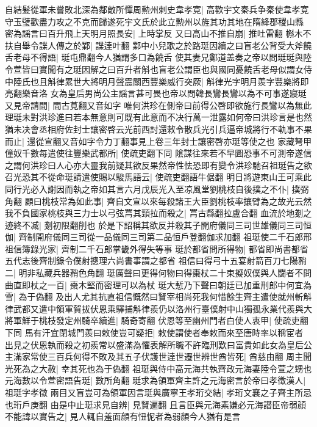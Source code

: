 自結髪從軍未嘗敗北深為鄰敵所憚周勲州刺史韋孝寛|{
	高歡宇文秦兵争秦使韋孝寛守玉璧歡盡力攻之不克而歸遂死宇文氏於此立勲州以旌其功其地在隋絳郡稷山縣}
密為謡言曰百升飛上天明月照長安|{
	上時掌反}
又曰高山不推自崩|{
	推吐雷翻}
槲木不扶自舉令諜人傳之於鄴|{
	諜逹叶翻}
鄴中小兒歌之於路珽因續之曰盲老公背受大斧饒舌老母不得語|{
	珽屯鼎翻今人猶謂多口為饒舌}
使其妻兄鄭道盖奏之帝以問珽珽與陸令萱皆曰實聞有之珽因解之曰百升者斛也盲老公謂臣也與國同憂饒舌老母似謂女侍中陸氏也且斛律累世大將明月聲震關西豐樂威行突厥|{
	斛律光字明月羨字豐樂將即亮翻樂音洛}
女為皇后男尚公主謡言甚可畏也帝以問韓長鸞長鸞以為不可事遂寢珽又見帝請間|{
	間古莧翻又音如字}
唯何洪珍在側帝曰前得公啓即欲施行長鸞以為無此理珽未對洪珍進曰若本無意則可既有此意而不决行萬一泄露如何帝曰洪珍言是也然猶未决會丞相府佐封士讓密啓云光前西討還敕令散兵光引兵逼帝城將行不軌事不果而止|{
	還從宣翻又音如字令力丁翻事見上卷三年封士讓密啓亦珽等使之也}
家藏弩甲僮奴千數每遣使往豐樂武都所|{
	使疏吏翻下同}
隂謀往來若不早圖恐事不可測帝遂信之謂何洪珍曰人心亦大靈我前疑其欲反果然帝性怯恐即有變令洪珍馳召祖珽告之欲召光恐其不從命珽請遣使賜以駿馬語云|{
	使疏吏翻語牛倨翻}
明日將遊東山王可乘此同行光必入謝因而執之帝如其言六月戊辰光入至凉風堂劉桃枝自後撲之不仆|{
	撲弼角翻}
顧曰桃枝常為如此事|{
	齊自文宣以來每殺諸王大臣劉桃枝率攘臂為之故光云然}
我不負國家桃枝與三力士以弓弦罥其頸拉而殺之|{
	罥古縣翻拉盧合翻}
血流於地剗之迹終不㓕|{
	剗初限翻削也}
於是下詔稱其欲反并殺其子開府儀同三司世雄儀同三司恒伽|{
	齊制開府儀同三司從一品儀同三司第二品恒戶登翻伽求加翻}
祖珽使二千石郎邢祖信簿錄光家|{
	齊制二千石郎掌畿外得失等事}
珽於都省問所得物|{
	都省即尚書都省五代志後齊制錄令僕射摠理六尚書事謂之都省}
祖信曰得弓十五宴射箭百刀七陽矟二|{
	明非私藏兵器矟色角翻}
珽厲聲曰更得何物曰得棗杖二十束擬奴僕與人闘者不問曲直即杖之一百|{
	棗木堅而密理可以為杖}
珽大慙乃下聲曰朝廷已加重刑郎中何宜為雪|{
	為于偽翻}
及出人尤其抗直祖信慨然曰賢宰相尚死我何惜餘生齊主遣使就州斬斛律武都又遣中領軍賀拔伏恩乘驛捕斛律羨仍以洛州行臺僕射中山獨孤永業代羨與大將軍鮮于桃枝發定州騎卒續進|{
	騎奇寄翻}
伏恩等至幽州門者白使人衷甲|{
	使疏吏翻下同}
馬有汗宜閉城門羨曰敕使豈可疑拒|{
	敕使謂使者奉敕而來至唐時率以稱宦者}
出見之伏恩執而殺之初羨常以盛滿為懼表解所職不許臨刑歎曰富貴如此女為皇后公主滿家常使三百兵何得不敗及其五子伏護世逹世遷世辨世酋皆死|{
	酋慈由翻}
周主聞光死為之大赦|{
	幸其死也為于偽翻}
祖珽與侍中高元海共執齊政元海妻陸令萱之甥也元海數以令萱密語告珽|{
	數所角翻}
珽求為領軍齊主許之元海密言於帝曰孝徵漢人|{
	祖珽字孝徵}
兩目又盲豈可為領軍因言珽與廣寧王孝珩交結|{
	孝珩文襄之子齊主所忌也珩戶庚翻}
由是中止珽求見自辨|{
	見賢遍翻}
且言臣與元海素嫌必元海譛臣帝弱顔不能諱以實告之|{
	見人輒自羞面顔有忸怩者為弱顔今人猶有是言}
